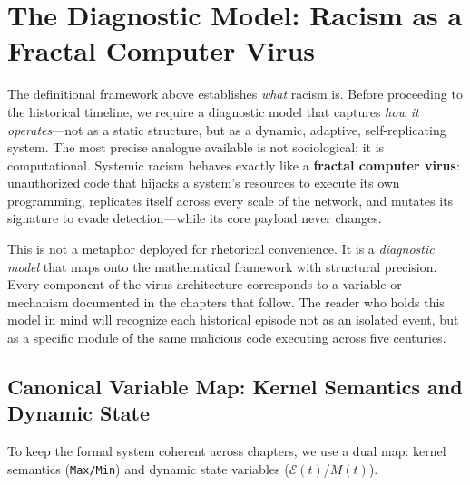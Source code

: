 \documentclass[12pt,openany]{book}
\begin{document}
\section{The Diagnostic Model: Racism as a Fractal Computer Virus}

The definitional framework above establishes \textit{what} racism is. Before proceeding to the historical timeline, we require a diagnostic model that captures \textit{how it operates}---not as a static structure, but as a dynamic, adaptive, self-replicating system. The most precise analogue available is not sociological; it is computational. Systemic racism behaves exactly like a \textbf{fractal computer virus}: unauthorized code that hijacks a system's resources to execute its own programming, replicates itself across every scale of the network, and mutates its signature to evade detection---while its core payload never changes.

This is not a metaphor deployed for rhetorical convenience. It is a \textit{diagnostic model} that maps onto the mathematical framework with structural precision. Every component of the virus architecture corresponds to a variable or mechanism documented in the chapters that follow. The reader who holds this model in mind will recognize each historical episode not as an isolated event, but as a specific module of the same malicious code executing across five centuries.

\subsection{Canonical Variable Map: Kernel Semantics and Dynamic State}

To keep the formal system coherent across chapters, we use a dual map: kernel semantics (\texttt{Max/Min}) and dynamic state variables ($\mathcal{E}(t)$/$M(t)$).
\end{document}
